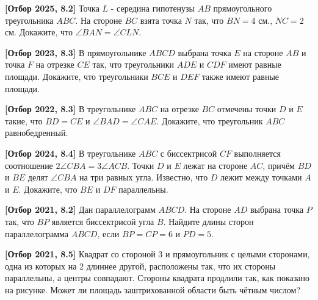 \textbf{[Отбор 2025, 8.2]}
Точка $L$ - середина гипотенузы $A B$ прямоугольного треугольника $A B C$. На стороне $B C$ взята точка $N$ так, что $B N=4$ см., $N C=2$ см. Докажите, что $\angle B A N=\angle C L N$.

\textbf{[Отбор 2023, 8.3]} В прямоугольнике $A B C D$ выбрана точка $E$ на стороне $A B$ и точка $F$ на отрезке $C E$ так, что треугольники $A D E$ и $C D F$ имеют равные площади. Докажите, что треугольники $B C E$ и $D E F$ также имеют равные площади.

\textbf{[Отбор 2022, 8.3]}
В треугольнике $A B C$ на отрезке $B C$ отмечены точки $D$ и $E$ такие, что $B D= C E$ и $\angle B A D=\angle C A E$. Докажите, что треугольник $A B C$ равнобедренный.

\textbf{[Отбор 2024, 8.4]}
В треугольнике $A B C$ с биссектрисой $C F$ выполняется соотношение $2 \angle C B A= 3 \angle A C B$. Точки $D$ и $E$ лежат на стороне $A C$, причём $B D$ и $B E$ делят $\angle C B A$ на три равных угла. Известно, что $D$ лежит между точками $A$ и $E$. Докажите, что $B E$ и $D F$ параллельны.

\textbf{[Отбор 2021, 8.2]}
Дан параллелограмм $A B C D$. На стороне $A D$ выбрана точка $P$ так, что $B P$ является биссектрисой угла $B$. Найдите длины сторон параллелограмма $A B C D$, если $B P=C P=6$ и $P D=5$.

\textbf{[Отбор 2021, 8.5]}
Квадрат со стороной 3 и прямоугольник с целыми сторонами, одна из которых на 2 длиннее другой, расположены так, что их стороны параллельны, а центры совпадают. Стороны квадрата продлили так, как показано на рисунке. Может ли площадь заштрихованной области быть чётным числом?
